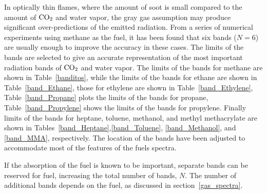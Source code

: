 In optically thin flames, where the amount of soot is small compared to the amount of $\rm CO_2$ and water vapor, the gray gas
assumption may produce significant over-predictions of the emitted radiation.
From a series of numerical experiments using methane as the fuel, it has been found
that six bands ($N=6$) are usually enough to improve the accuracy in these cases. 
The limits of the bands are selected to give an accurate
representation of the most important radiation bands of $\rm CO_2$ and water vapor.
The limits of the bands for methane are shown in Table~\ref{banditos}, while the limits of the bands 
for ethane are shown in Table~\ref{band_Ethane}, those for ethylene are shown in Table~\ref{band_Ethylene},
Table~\ref{band_Propane} plots the limits of the bands for propane, Table~\ref{band_Propylene} shows the limits of the bands 
for propylene. Finally limits of the bands for heptane, toluene, methanol, and methyl methacrylate are shown in Tables~\ref{band_Heptane},\ref{band_Toluene},
\ref{band_Methanol}, and \ref{band_MMA}, respectively. The location of the bands have been adjusted to accommodate most of the features of the fuels spectra.

If the absorption of the fuel is known to be important, separate bands can be reserved for fuel, increasing the total number of bands, $N$. The number of
additional bands depends on the fuel, as discussed in section~\ref{gas_spectra}.

